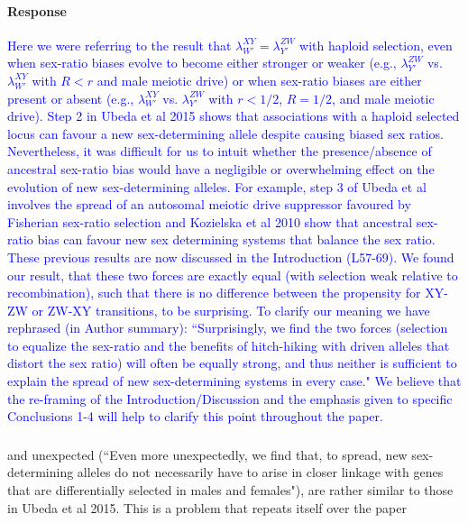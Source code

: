 \documentclass[10pt,letterpaper]{article}
\begin{document}
\noindent\paragraph{Response}
\textcolor{blue}{
Here we were referring to the result that $\lambda_{W'}^{XY} = \lambda_{Y'}^{ZW}$ with haploid selection, even when sex-ratio biases evolve to become either stronger or weaker (e.g., $\lambda_{Y'}^{ZW}$ vs. $\lambda_{W'}^{XY}$ with $R<r$ and male meiotic drive) or when sex-ratio biases are either present or absent (e.g., $\lambda_{W'}^{XY}$ vs. $\lambda_{Y'}^{ZW}$ with $r<1/2$, $R=1/2$, and male meiotic drive).  
Step 2 in Ubeda et al 2015 shows that associations with a haploid selected locus can favour a new sex-determining allele despite causing biased sex ratios. 
Nevertheless, it was difficult for us to intuit whether the presence/absence of ancestral sex-ratio bias would have a negligible or overwhelming effect on the evolution of new sex-determining alleles. 
For example, step 3 of Ubeda et al involves the spread of an autosomal meiotic drive suppressor favoured by Fisherian sex-ratio selection and Kozielska et al 2010 show that ancestral sex-ratio bias can favour new sex determining systems that balance the sex ratio.
These previous results are now discussed in the Introduction (L57-69). 
We found our result, that these two forces are exactly equal (with selection weak relative to recombination), such that there is no difference between the propensity for XY-ZW or ZW-XY transitions, to be surprising.
To clarify our meaning we have rephrased (in Author summary): ``Surprisingly, we find the two forces (selection to equalize the sex-ratio and the benefits of hitch-hiking with driven alleles that distort the sex ratio) will often be equally strong, and thus neither is sufficient to explain the spread of new sex-determining systems in every case." 
We believe that the re-framing of the Introduction/Discussion and the emphasis given to specific Conclusions 1-4 will help to clarify this point throughout the paper.
}

\noindent\subsubsection{}
\noindent and unexpected (``Even more unexpectedly, we find that, to spread, new sex-determining alleles do not necessarily have to arise in closer linkage with genes that are differentially selected in males and females"), are rather similar to those in Ubeda et al 2015. This is a problem that repeats itself over the paper 
\end{document}
